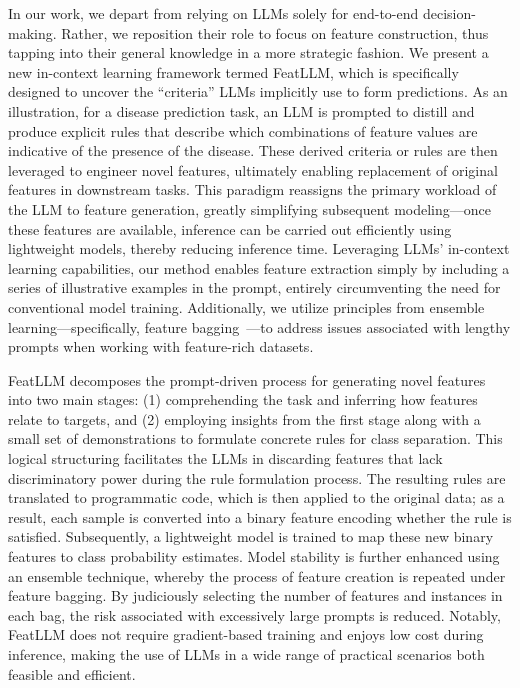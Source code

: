 In our work, we depart from relying on LLMs solely for end-to-end decision-making. Rather, we reposition their role to focus on feature construction, thus tapping into their general knowledge in a more strategic fashion. We present a new in-context learning framework termed \textsf{FeatLLM}, which is specifically designed to uncover the “criteria” LLMs implicitly use to form predictions. As an illustration, for a disease prediction task, an LLM is prompted to distill and produce explicit rules that describe which combinations of feature values are indicative of the presence of the disease. These derived criteria or rules are then leveraged to engineer novel features, ultimately enabling replacement of original features in downstream tasks. This paradigm reassigns the primary workload of the LLM to feature generation, greatly simplifying subsequent modeling—once these features are available, inference can be carried out efficiently using lightweight models, thereby reducing inference time. Leveraging LLMs’ in-context learning capabilities, our method enables feature extraction simply by including a series of illustrative examples in the prompt, entirely circumventing the need for conventional model training. Additionally, we utilize principles from ensemble learning—specifically, feature bagging~\cite{breiman2001random}—to address issues associated with lengthy prompts when working with feature-rich datasets.

\textsf{FeatLLM} decomposes the prompt-driven process for generating novel features into two main stages: (1) comprehending the task and inferring how features relate to targets, and (2) employing insights from the first stage along with a small set of demonstrations to formulate concrete rules for class separation. This logical structuring facilitates the LLMs in discarding features that lack discriminatory power during the rule formulation process. The resulting rules are translated to programmatic code, which is then applied to the original data; as a result, each sample is converted into a binary feature encoding whether the rule is satisfied. Subsequently, a lightweight model is trained to map these new binary features to class probability estimates. Model stability is further enhanced using an ensemble technique, whereby the process of feature creation is repeated under feature bagging. By judiciously selecting the number of features and instances in each bag, the risk associated with excessively large prompts is reduced. Notably, \textsf{FeatLLM} does not require gradient-based training and enjoys low cost during inference, making the use of LLMs in a wide range of practical scenarios both feasible and efficient.

